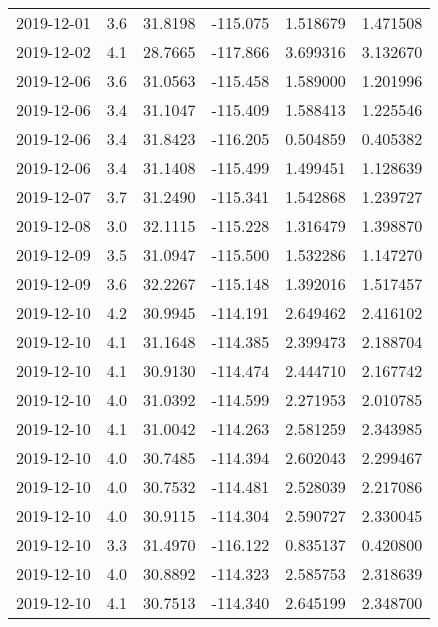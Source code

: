 \begin{tabular}{lrrrrr}
2019-12-01 &       3.6 &  31.8198 &  -115.075 &         1.518679 &         1.471508 \\
2019-12-02 &       4.1 &  28.7665 &  -117.866 &         3.699316 &         3.132670 \\
2019-12-06 &       3.6 &  31.0563 &  -115.458 &         1.589000 &         1.201996 \\
2019-12-06 &       3.4 &  31.1047 &  -115.409 &         1.588413 &         1.225546 \\
2019-12-06 &       3.4 &  31.8423 &  -116.205 &         0.504859 &         0.405382 \\
2019-12-06 &       3.4 &  31.1408 &  -115.499 &         1.499451 &         1.128639 \\
2019-12-07 &       3.7 &  31.2490 &  -115.341 &         1.542868 &         1.239727 \\
2019-12-08 &       3.0 &  32.1115 &  -115.228 &         1.316479 &         1.398870 \\
2019-12-09 &       3.5 &  31.0947 &  -115.500 &         1.532286 &         1.147270 \\
2019-12-09 &       3.6 &  32.2267 &  -115.148 &         1.392016 &         1.517457 \\
2019-12-10 &       4.2 &  30.9945 &  -114.191 &         2.649462 &         2.416102 \\
2019-12-10 &       4.1 &  31.1648 &  -114.385 &         2.399473 &         2.188704 \\
2019-12-10 &       4.1 &  30.9130 &  -114.474 &         2.444710 &         2.167742 \\
2019-12-10 &       4.0 &  31.0392 &  -114.599 &         2.271953 &         2.010785 \\
2019-12-10 &       4.1 &  31.0042 &  -114.263 &         2.581259 &         2.343985 \\
2019-12-10 &       4.0 &  30.7485 &  -114.394 &         2.602043 &         2.299467 \\
2019-12-10 &       4.0 &  30.7532 &  -114.481 &         2.528039 &         2.217086 \\
2019-12-10 &       4.0 &  30.9115 &  -114.304 &         2.590727 &         2.330045 \\
2019-12-10 &       3.3 &  31.4970 &  -116.122 &         0.835137 &         0.420800 \\
2019-12-10 &       4.0 &  30.8892 &  -114.323 &         2.585753 &         2.318639 \\
2019-12-10 &       4.1 &  30.7513 &  -114.340 &         2.645199 &         2.348700 \\

\end{tabular}
